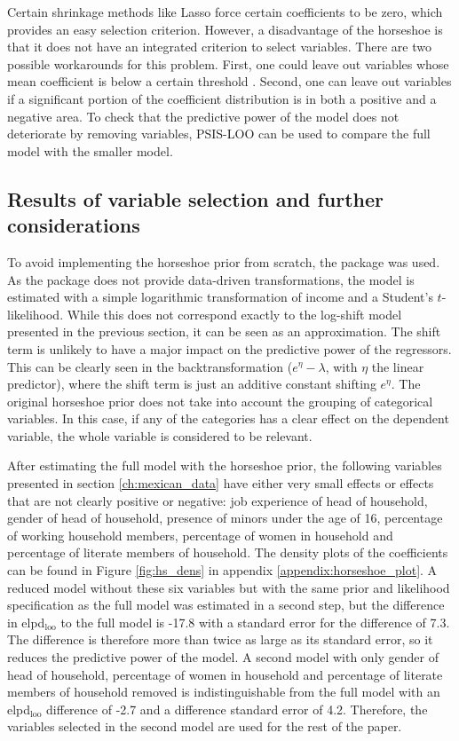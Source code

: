 Certain shrinkage methods like Lasso force certain coefficients to be zero, which provides an easy selection criterion.
However, a disadvantage of the horseshoe is that it does not have an integrated criterion to select variables. There are two possible workarounds for this problem.
First, one could leave out variables whose mean coefficient is below a certain threshold \citep{piironen_sparsity_2017}.
Second, one can leave out variables if a significant portion of the coefficient distribution is in both a positive and a negative area.
To check that the predictive power of the model does not deteriorate by removing variables, PSIS-LOO can be used to compare the full model with the smaller model.

\subsection{Results of variable selection and further considerations}
To avoid implementing the horseshoe prior from scratch, the package  was used.
As the package does not provide data-driven transformations, the model is estimated with a simple logarithmic transformation of income and a Student's $t$-likelihood.
While this does not correspond exactly to the log-shift model presented in the previous section, it can be seen as an approximation.
The shift term is unlikely to have a major impact on the predictive power of the regressors.
This can be clearly seen in the backtransformation ($e^\eta - \lambda$, with $\eta$ the linear predictor), where the shift term is just an additive constant shifting $e^\eta$.
The original horseshoe prior does not take into account the grouping of categorical variables.
In this case, if any of the categories has a clear effect on the dependent variable, the whole variable is considered to be relevant.

After estimating the full model with the horseshoe prior, the following variables presented in section \ref{ch:mexican_data} have either very small effects or effects that are not clearly positive or negative: job experience of head of household, gender of head of household, presence of minors under the age of 16, percentage of working household members, percentage of women in household and percentage of literate members of household.
The density plots of the coefficients can be found in Figure \ref{fig:hs_dens} in appendix \ref{appendix:horseshoe_plot}.
A reduced model without these six variables but with the same prior and likelihood specification as the full model was estimated in a second step, but the difference in elpd$_{\text{loo}}$ to the full model is -17.8 with a standard error for the difference of 7.3.
The difference is therefore more than twice as large as its standard error, so it reduces the predictive power of the model.
A second model with only gender of head of household, percentage of women in household and percentage of literate members of household removed is indistinguishable from the full model with an elpd$_{\text{loo}}$ difference of -2.7 and a difference standard error of 4.2.
Therefore, the variables selected in the second model are used for the rest of the paper.

